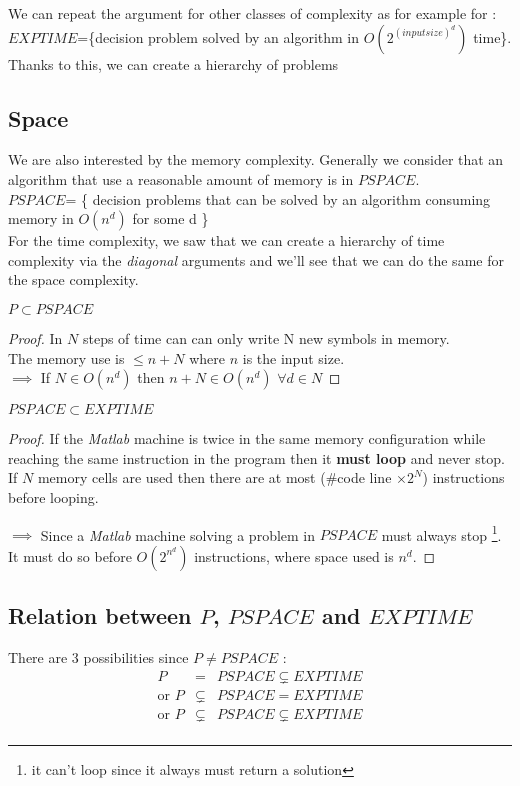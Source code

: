 We can repeat the argument for other classes of complexity as for example for :\\
$EXPTIME$=\{decision problem solved by an algorithm in $O(2^{(input size)^d})$ time\}.\\
Thanks to this, we can create a hierarchy of problems

\subsection{Space}
We are also interested by the memory complexity. Generally we consider that an algorithm that use a reasonable amount of memory is in $PSPACE$. \\
$PSPACE$= \{
decision problems that can be solved by an algorithm consuming memory in $O(n^d)$ for some d \}\\
For the time complexity, we saw that we can create a hierarchy of time complexity via the \emph{diagonal} arguments and we'll see that we can do the same for the space complexity.\\

\begin{theorem} $P \subset PSPACE$ 
\end{theorem}
\begin{proof}
In $N$ steps of time can can only write N new symbols in memory. \\
The memory use is $\leq n + N$ where $n$ is the input size.\\
$\implies$ If  $N \in O(n^d)$ then $n+N\in O(n^d) $ $\forall d \in N$

\end{proof}

\begin{theorem} $PSPACE \subset EXPTIME$
\end{theorem}
\begin{proof}
If the \emph{Matlab} machine is twice in the same memory configuration while reaching
the same instruction in the program then it \textbf{must loop} and never stop.
If $N$ memory cells are used then there are at most ($\#$code line $\times 2^N$) instructions before looping.

$\implies$ Since a \emph{Matlab} machine solving a problem in $PSPACE$ must always stop \footnote{it can't loop since it always must return a solution}.
It must do so before $O(2^{n^d})$ instructions, where space used is $n^d$.
\end{proof}

\subsection{Relation between $P$, $PSPACE$ and $EXPTIME$}
There are 3 possibilities since $P \neq PSPACE$ :
\begin{eqnarray}
P&=&PSPACE\subsetneq EXPTIME\\
\text{or }P&\subsetneq &PSPACE= EXPTIME\\
\text{or }P&\subsetneq &PSPACE\subsetneq EXPTIME\\
\end{eqnarray}

